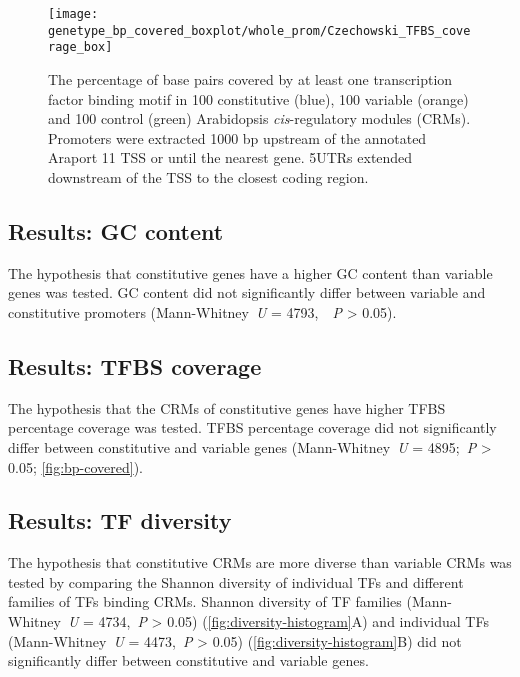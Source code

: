 \begin{figure}[!h]
	\begin{center}
		\capstart
		\texttt{[image: genetype\_bp\_covered\_boxplot/whole\_prom/Czechowski\_TFBS\_coverage\_box]}
		\caption{
			The percentage of base pairs covered by at least one transcription
			factor binding motif in 100 constitutive (blue), 100 variable (orange) and 100 control (green)
			Arabidopsis \textit{cis}-regulatory modules (CRMs). Promoters were extracted 1000 bp upstream of the
			annotated Araport 11 \autocite{chengAraport11CompleteReannotation2017} TSS or until the nearest gene. 5UTRs extended downstream of the TSS to the closest coding region.
			\label{fig:bp-covered}
		}
	\end{center}
\end{figure}

\subsection{Results: GC content}
The hypothesis that constitutive genes have a higher GC content than variable genes was tested.
GC content did not significantly differ between variable and constitutive promoters (Mann\hyp{}Whitney~\textit{U} = 4793,~~\textit{P} \textgreater{} 0.05).

\subsection{Results: TFBS coverage}
The hypothesis that the CRMs of constitutive genes have higher TFBS percentage coverage was tested. TFBS percentage coverage did not significantly differ between constitutive and variable genes (Mann\hyp{}Whitney~\textit{U} = 4895;~\textit{P}
\textgreater{} 0.05; \autoref{fig:bp-covered}).

\subsection{Results: TF diversity}

The hypothesis that constitutive CRMs are more diverse than variable CRMs was tested by comparing the Shannon diversity of individual TFs and different families of TFs binding
CRMs. Shannon diversity of TF families (Mann\hyp{}Whitney~\textit{U} = 4734,~\textit{P} \textgreater{} 0.05) (\autoref{fig:diversity-histogram}A) and individual TFs (Mann\hyp{}Whitney~\textit{U} = 4473,~\textit{P} \textgreater{} 0.05) (\autoref{fig:diversity-histogram}B) did not significantly differ between constitutive and variable genes.

